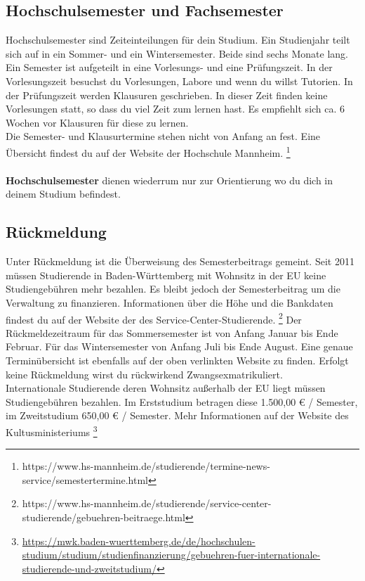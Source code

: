 \subsection*{Hochschulsemester und Fachsemester}
Hochschulsemester sind Zeiteinteilungen für dein Studium.
Ein Studienjahr teilt sich auf in ein Sommer- und ein Wintersemester.
Beide sind sechs Monate lang.
Ein Semester ist aufgeteilt in eine Vorlesungs- und eine Prüfungszeit.
In der Vorlesungszeit besuchst du Vorlesungen, Labore und wenn du willst Tutorien.
In der Prüfungszeit werden Klausuren geschrieben.
In dieser Zeit finden keine Vorlesungen statt, so dass du viel Zeit zum lernen hast.
Es empfiehlt sich ca. 6 Wochen vor Klausuren für diese zu lernen.
\\
Die Semester- und Klausurtermine stehen nicht von Anfang an fest.
Eine Übersicht findest du auf der Website der Hochschule Mannheim.
\footnote{https://www.hs-mannheim.de/studierende/termine-news-service/semestertermine.html}
\\\\
\textbf{Hochschulsemester} dienen wiederrum nur zur Orientierung wo du dich in deinem Studium befindest.

\subsection*{Rückmeldung}
Unter Rückmeldung ist die Überweisung des Semesterbeitrags gemeint.
Seit 2011 müssen Studierende in Baden-Württemberg mit Wohnsitz in der EU keine Studiengebühren mehr bezahlen.
Es bleibt jedoch der Semesterbeitrag um die Verwaltung zu finanzieren.
Informationen über die Höhe und die Bankdaten findest du auf der Website der des Service-Center-Studierende.
\footnote{https://www.hs-mannheim.de/studierende/service-center-studierende/gebuehren-beitraege.html}
Der Rückmeldezeitraum für das Sommersemester ist von Anfang Januar bis Ende Februar.
Für das Wintersemester von Anfang Juli bis Ende August.
Eine genaue Terminübersicht ist ebenfalls auf der oben verlinkten Website zu finden.
Erfolgt keine Rückmeldung wirst du rückwirkend Zwangsexmatrikuliert.
\\
Internationale Studierende deren Wohnsitz außerhalb der EU liegt müssen Studiengebühren bezahlen.
Im Erststudium betragen diese 1.500,00 € / Semester, im Zweitstudium 650,00 € / Semester.
Mehr Informationen auf der Website des Kultusministeriums \footnote{\url{https://mwk.baden-wuerttemberg.de/de/hochschulen-studium/studium/studienfinanzierung/gebuehren-fuer-internationale-studierende-und-zweitstudium/}}

